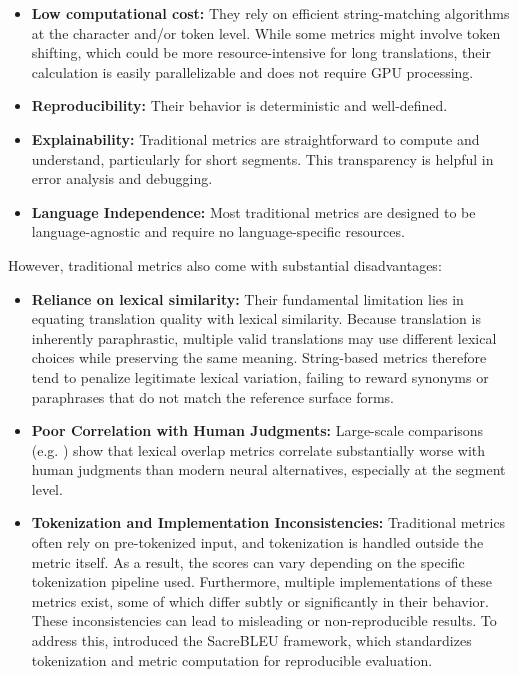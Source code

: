 \begin{itemize}
    \item \textbf{Low computational cost:} They rely on efficient string-matching algorithms at the character and/or token level. While some metrics might involve token shifting, which could be more resource-intensive for long translations, their calculation is easily parallelizable and does not require GPU processing.
    \item \textbf{Reproducibility:}  Their behavior is deterministic and well-defined.
    \item \textbf{Explainability:} Traditional metrics are straightforward to compute and understand, particularly for short segments. This transparency is helpful in error analysis and debugging.
    \item \textbf{Language Independence:} Most traditional metrics are designed to be language-agnostic and require no language-specific resources.
\end{itemize}
    
However, traditional metrics also come with substantial disadvantages:
\begin{itemize}
    \item \textbf{Reliance on lexical similarity:} Their fundamental limitation lies in equating translation quality with lexical similarity. Because translation is inherently paraphrastic, multiple valid translations may use different lexical choices while preserving the same meaning. String-based metrics therefore tend to penalize legitimate lexical variation, failing to reward synonyms or paraphrases that do not match the reference surface forms.
    \item  \textbf{Poor Correlation with Human Judgments:} Large-scale comparisons (e.g. \citealp{mathur-etal-2020-tangled, freitag-etal-2022-results}) show that lexical overlap metrics correlate substantially worse with human judgments than modern neural alternatives, especially at the segment level.
    \item \textbf{Tokenization and Implementation Inconsistencies:} Traditional metrics often rely on pre-tokenized input, and tokenization is handled outside the metric itself. As a result, the scores can vary depending on the specific tokenization pipeline used. Furthermore, multiple implementations of these metrics exist, some of which differ subtly or significantly in their behavior. These inconsistencies can lead to misleading or non-reproducible results. To address this, \citet{post-2018-call} introduced the SacreBLEU framework, which standardizes tokenization and metric computation for reproducible evaluation.
\end{itemize}


